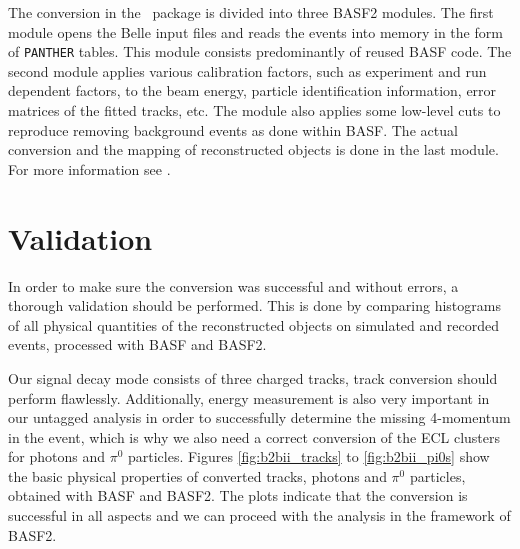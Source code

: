 The conversion in the \btbii~package is divided into three BASF2 modules. The first module opens the Belle input files and reads the events into memory in the form of \texttt{PANTHER} tables. This module consists predominantly of reused BASF code. The second module applies various calibration factors, such as experiment and run dependent factors, to the beam energy, particle identification information, error matrices of the fitted tracks, etc. The module also applies some low-level cuts to reproduce removing background events as done within BASF. The actual conversion and the mapping of reconstructed objects is done in the last module. For more information see \cite{Keck:48940}.

\section{Validation}

In order to make sure the conversion was successful and without errors, a thorough validation should be performed. This is done by comparing histograms of all physical quantities of the reconstructed objects on simulated and recorded events, processed with BASF and BASF2. 

Our signal decay mode consists of three charged tracks, track conversion should perform flawlessly. Additionally, energy measurement is also very important in our untagged analysis in order to successfully determine the missing 4-momentum in the event, which is why we also need a correct conversion of the ECL clusters for photons and $\pi^0$ particles. Figures \ref{fig:b2bii_tracks} to \ref{fig:b2bii_pi0s} show the basic physical properties of converted tracks, photons and $\pi^0$ particles, obtained with BASF and BASF2. The plots indicate that the conversion is successful in all aspects and we can proceed with the analysis in the framework of BASF2.

